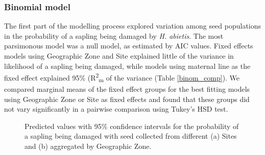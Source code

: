 \documentclass[a4paper, 11pt]{article}
\newcommand{\textapprox}{\raisebox{0.5ex}{\texttildelow}}
\begin{document}
\subsubsection*{Binomial model}

The first part of the modelling process explored variation among seed populations in the probability of a sapling being damaged by \textit{H. abietis}. The most parsimonous model was a null model, as estimated by AIC values. Fixed effects models using Geographic Zone and Site explained little of the variance in likelihood of a sapling being damaged, while models using maternal line as the fixed effect explained \textapprox{}95\% (R\textsuperscript{2}\textsubscript{m} of the variance (Table \ref{binom_comp}). We compared marginal means of the fixed effect groups for the best fitting models using Geographic Zone or Site as fixed effects and found that these groups did not vary significantly in a pairwise comparison using Tukey's HSD test.

\begin{figure}[H]
\centering
	\caption{Predicted values with 95\% confidence intervals for the probability of a sapling being damaged with seed collected from different (a) Sites and (b) aggregated by Geographic Zone.}
	\label{pred_binom}
\end{figure}
\end{document}
